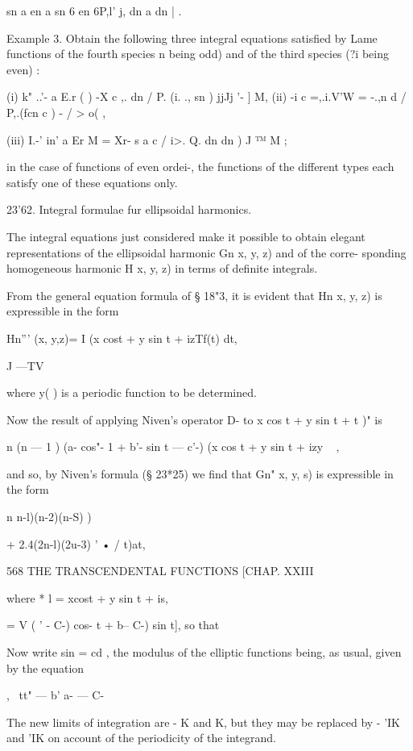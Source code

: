 {{{{{{{{sn a en a sn 6 en 6P,l'   j, dn a dn   | . 

Example 3. Obtain the following three integral equations satisfied by Lame functions 
of the fourth species  n being odd) and of the third species (?i being even) : 

(i) k" ..'- a E.r ( ) -X c  ,. dn   /    P. (i. .,    sn  )    jjJj  '- ] M, 
(ii) -i c =,.i.V'W =   -.,n d  / P,.(fcn c  )   - / > o( , 

(iii) I.-' in' a Er M = Xr- s  a c   /  i>. Q. dn   dn  )     J  ™  M ; 

in the case of functions of even ordei-, the functions of the different types each satisfy one 
of these equations only. 

23'62. Integral formulae fur ellipsoidal harmonics. 

The integral equations just considered make it possible to obtain elegant 
representations of the ellipsoidal harmonic Gn   x, y, z) and of the corre- 
sponding homogeneous harmonic H   x, y, z) in terms of definite integrals. 

From the general equation formula of § 18"3, it is evident that Hn   x, y, z) 
is expressible in the form 

Hn''' (x, y,z)= I (x cost + y sin t + izTf(t) dt, 

J —TV 

where y( ) is a periodic function to be determined. 

Now the result of applying Niven's operator D- to  x cos t + y sin t + t )" is 

n (n — 1 ) (a- cos"- 1 + b'- sin  t — c'-) (x cos t + y sin t + izy ~ , 

and so, by Niven's formula (§ 23*25) we find that Gn"   x, y, s) is expressible 
in the form 

n n-l)(n-2)(n-S) ) 

+ 2.4(2n-l)(2u-3)  '     • / t)at, 



568 THE TRANSCENDENTAL FUNCTIONS [CHAP. XXIII 

where * l = xcost + y sin t + is, 

  = V ( ' - C-) cos- t +  b-- C-) sin  t], 
so that 

Now write sin   = cd  , the modulus of the elliptic functions being, as 
usual, given by the equation 

, \  tt" — b' 
a- — C- 

The new limits of integration are -  K and K, but they may be replaced 
by - 'IK and 'IK on account of the periodicity of the integrand. 

}}}}}}}}
